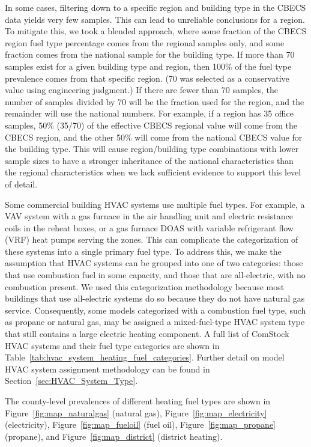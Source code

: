 In some cases, filtering down to a specific region and building type in the CBECS data yields very few samples. This can lead to unreliable conclusions for a region. To mitigate this, we took a blended approach, where some fraction of the CBECS region fuel type percentage comes from the regional samples only, and some fraction comes from the national sample for the building type. If more than 70 samples exist for a given building type and region, then 100\% of the fuel type prevalence comes from that specific region. (70 was selected as a conservative value using engineering judgment.) If there are fewer than 70 samples, the number of samples divided by 70 will be the fraction used for the region, and the remainder will use the national numbers. For example, if a region has 35 office samples, 50\% (35\//70) of the effective CBECS regional value will come from the CBECS region, and the other 50\% will come from the national CBECS value for the building type. This will cause region/building type combinations with lower sample sizes to have a stronger inheritance of the national characteristics than the regional characteristics when we lack sufficient evidence to support this level of detail.

Some commercial building HVAC systems use multiple fuel types. For example, a VAV system with a gas furnace in the air handling unit and electric resistance coils in the reheat boxes, or a gas furnace DOAS with variable refrigerant flow (VRF) heat pumps serving the zones. This can complicate the categorization of these systems into a single primary fuel type. To address this, we make the assumption that HVAC systems can be grouped into one of two categories: those that use combustion fuel in some capacity, and those that are all-electric, with no combustion present. We used this categorization methodology because most buildings that use all-electric systems do so because they do not have natural gas service. Consequently, some models categorized with a combustion fuel type, such as propane or natural gas, may be assigned a mixed-fuel-type HVAC system type that still contains a large electric heating component. A full list of ComStock HVAC systems and their fuel type categories are shown in Table~\ref{tab:hvac_system_heating_fuel_categories}. Further detail on model HVAC system assignment methodology can be found in Section~\ref{sec:HVAC_System_Type}.

The county-level prevalences of different heating fuel types are shown in Figure~\ref{fig:map_naturalgas} (natural gas), Figure~\ref{fig:map_electricity} (electricity), Figure~\ref{fig:map_fueloil} (fuel oil), Figure~\ref{fig:map_propane} (propane), and Figure~\ref{fig:map_district} (district heating).

